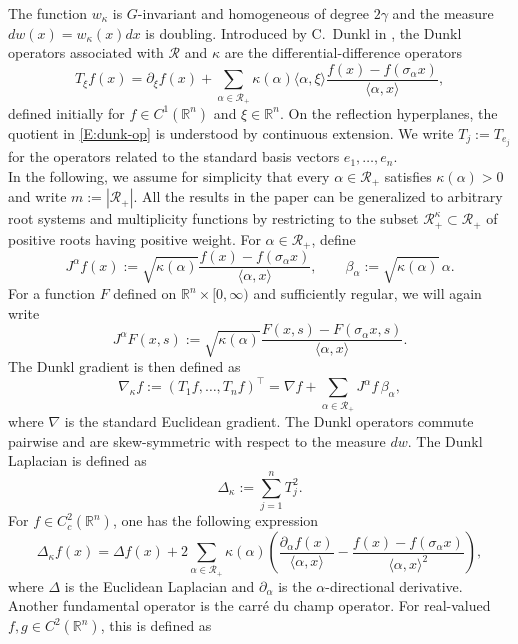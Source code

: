 \documentclass[11pt]{amsart}
\theoremstyle{definition}
\theoremstyle{remark}
\numberwithin{equation}{section}
\newcommand{\R}{\mathbb{R}}
\newcommand{\RR}{\mathcal{R}}
\begin{document}
The function $w_\kappa$ is $G$-invariant and homogeneous of degree
$2\gamma$ and the measure $dw(x)=w_\kappa(x)dx$ is doubling.
Introduced by C.~Dunkl in \cite{Dunkl87}, the Dunkl operators associated
with $\RR$ and $\kappa$ are the differential-difference operators
\begin{equation}
T_\xi f(x)
=
\partial_\xi f(x)
+
\sum_{\alpha\in\RR_+}
\kappa(\alpha)\langle\alpha,\xi\rangle
\frac{f(x)-f(\sigma_\alpha x)}
{\langle\alpha,x\rangle},
\label{E:dunk-op}
\end{equation}
defined initially for $f\in C^1(\R^n)$ and $\xi\in\R^n$. On the
reflection hyperplanes, the quotient in \eqref{E:dunk-op} is understood
by continuous extension. We write $T_j:=T_{e_j}$ for the operators related to the standard basis
vectors $e_1,\ldots,e_n$. \\
In the following, we assume for simplicity that every $\alpha\in\RR_+$ satisfies $\kappa(\alpha)>0$ and write $m:=|\RR_+|$. All the results in the paper can be generalized to arbitrary root systems and multiplicity functions by restricting to the subset $\RR_+^\kappa\subset\RR_+$ of positive roots having positive weight. For $\alpha\in\RR_+$, define
\begin{equation}
J^\alpha f(x)
:=
\sqrt{\kappa(\alpha)}
\frac{f(x)-f(\sigma_\alpha x)}
{\langle\alpha,x\rangle},
\qquad
\beta_\alpha:=\sqrt{\kappa(\alpha)}\,\alpha.
\end{equation}
For a function $F$ defined on $\R^n\times[0,\infty)$ and sufficiently regular, we will again write
\[
J^\alpha F(x,s)
:=
\sqrt{\kappa(\alpha)}
\frac{F(x,s)-F(\sigma_\alpha x,s)}
{\langle\alpha,x\rangle}.
\]
The Dunkl gradient is then defined as
\[
\nabla_\kappa f
:=
(T_1f,\ldots,T_nf)^\top
=
\nabla f
+
\sum_{\alpha\in\RR_+}
J^\alpha f\,\beta_\alpha,
\]
where $\nabla$ is the standard Euclidean gradient.
The Dunkl operators commute pairwise and are skew-symmetric with respect
to the measure $dw$.
The Dunkl Laplacian is defined as
\[
\Delta_\kappa:=\sum_{j=1}^nT_j^2.
\]
For $f\in C_c^2(\R^n)$, one has the following expression
\begin{equation}
\Delta_\kappa f(x)
=
\Delta f(x)
+
2\sum_{\alpha\in\RR_+}
\kappa(\alpha)
\left(
\frac{\partial_\alpha f(x)}
{\langle\alpha,x\rangle}
-
\frac{f(x)-f(\sigma_\alpha x)}
{\langle\alpha,x\rangle^2}
\right),
\label{eq:dunkl-laplacian}
\end{equation}
where $\Delta$ is the Euclidean Laplacian and
$\partial_\alpha$ is the $\alpha$-directional derivative.
Another fundamental operator is the carr\'e du champ operator. For real-valued $f,g\in C^2(\R^n)$, this is defined as
\end{document}
